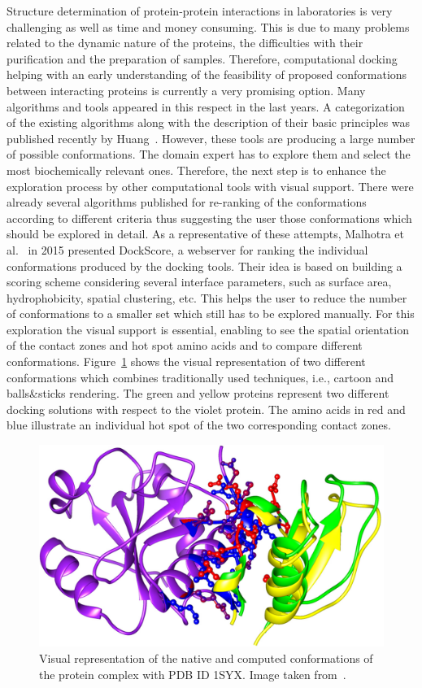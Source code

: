 \documentclass[journal]{vgtc}                %
\begin{document}
Structure determination of protein-protein interactions in laboratories is very challenging as well as time and money consuming.
This is due to many problems related to the dynamic nature of the proteins, the difficulties with their purification and the preparation of samples.
Therefore, computational docking helping with an early understanding of the feasibility of proposed conformations between interacting proteins is currently a very promising option.
Many algorithms and tools appeared in this respect in the last years.
A categorization of the existing algorithms along with the description of their basic principles was published recently by Huang~\cite{Huang2014}.
However, these tools are producing a large number of possible conformations.
The domain expert has to explore them and select the most biochemically relevant ones. 
Therefore, the next step is to enhance the exploration process by other computational tools with visual support.
There were already several algorithms published for re-ranking of the conformations according to different criteria thus suggesting the user those conformations which should be explored in detail.
As a representative of these attempts, Malhotra et al.~\cite{Malhotra2015} in 2015 presented DockScore, a webserver for ranking the individual conformations produced by the docking tools. 
Their idea is based on building a scoring scheme considering several interface parameters, such as surface area, hydrophobicity, spatial clustering, etc.
This helps the user to reduce the number of conformations to a smaller set which still has to be explored manually.
For this exploration the visual support is essential, enabling to see the spatial orientation of the contact zones and hot spot amino acids and to compare different conformations.
Figure~\ref{fig:dockscore} shows the visual representation of two different conformations which combines traditionally used techniques, i.e., cartoon and balls\&sticks rendering.
The green and yellow proteins represent two different docking solutions with respect to the violet protein. 
The amino acids in red and blue illustrate an individual hot spot of the two corresponding contact zones.

\begin{figure}[bt]
  \centering
  \includegraphics[width=0.8\columnwidth]{dockscore.png}
  \caption{Visual representation of the native and computed conformations of the protein complex with PDB ID 1SYX. Image taken from~\cite{Malhotra2015}.}
  \label{fig:dockscore}
\end{figure}
\end{document}

